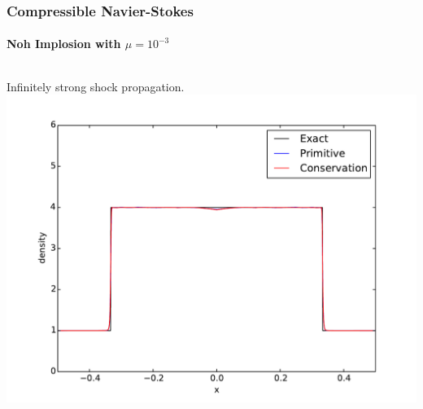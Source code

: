 \documentclass[18pt,xcolor=table]{beamer}
\begin{document}
%                                
%                                
% 
\begin{frame}[t]
\frametitle{Compressible Navier-Stokes}
\framesubtitle{Noh Implosion with $\mu=10^{-3}$}  %

\begin{columns}[t] %
\begin{column}[T]{0.5\textwidth} %
\hspace{1em}Infinitely strong shock propagation.
\includegraphics[height=1.0\textwidth]{Noh/FormulationComparison/den9.pdf}\\
\end{column}

\end{columns}
\end{frame}
\end{document}
